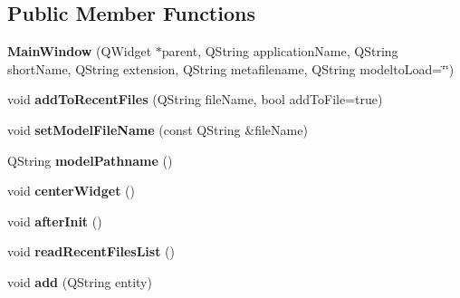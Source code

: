 \subsection*{Public Member Functions}
\begin{DoxyCompactItemize}
\item 
\mbox{\label{class_main_window_adaeb0eb98477a34255aa1b60e9962a57}} 
{\bfseries Main\+Window} (Q\+Widget $\ast$parent, Q\+String application\+Name, Q\+String short\+Name, Q\+String extension, Q\+String metafilename, Q\+String modelto\+Load=\char`\"{}\char`\"{})
\item 
\mbox{\label{class_main_window_a58ced2cfc105d3a766b46ed22a13de48}} 
void {\bfseries add\+To\+Recent\+Files} (Q\+String file\+Name, bool add\+To\+File=true)
\item 
\mbox{\label{class_main_window_ac530894fc3063c7c4a48f331cfbc851d}} 
void {\bfseries set\+Model\+File\+Name} (const Q\+String \&file\+Name)
\item 
\mbox{\label{class_main_window_a07cc9c04e10ff2c7c36d37dfa5c7a260}} 
Q\+String {\bfseries model\+Pathname} ()
\item 
\mbox{\label{class_main_window_ac737cbe46b6de36d873eb22abac7549a}} 
void {\bfseries center\+Widget} ()
\item 
\mbox{\label{class_main_window_a8691eeaa69072c0720d9a4a29b721e08}} 
void {\bfseries after\+Init} ()
\item 
\mbox{\label{class_main_window_ac9653f05335ec17513e4267d4903b3da}} 
void {\bfseries read\+Recent\+Files\+List} ()
\item 
\mbox{\label{class_main_window_afc43c13ff6bad44387bb98b8a7aa8a9f}} 
void {\bfseries add} (Q\+String entity)
\end{DoxyCompactItemize}
